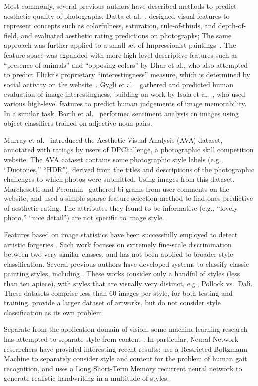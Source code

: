 Most commonly, several previous authors have described methods to predict aesthetic quality of photographs.
Datta et al.~\parencite{Datta-ECCV-2006}, designed visual features to represent concepts such as colorfulness, saturation, rule-of-thirds, and depth-of-field, and evaluated aesthetic rating predictions on photographs; The same approach was further applied to a small set of Impressionist paintings~\parencite{Li-SP-2009}.
The feature space was expanded with more high-level descriptive features such as ``presence of animals'' and ``opposing colors'' by Dhar et al., who also attempted to predict Flickr's proprietary ``interestingness'' measure, which is determined by social activity on the website~\parencite{Dhar-CVPR-2011}.
Gygli et al.~\parencite{Gygli-ICCV-2013} gathered and predicted human evaluation of image interestingness, building on work by Isola et al.~\parencite{Isola-CVPR-2011}, who used various high-level features to predict human judgements of image memorability.
In a similar task, Borth et al.~\parencite{Borth-MM-2013} performed sentiment analysis on images using object classifiers trained on adjective-noun pairs.

Murray et al.~\parencite{Murray-CVPR-2012} introduced the Aesthetic Visual Analysis (AVA) dataset, annotated with ratings by users of DPChallenge, a photographic skill competition website.
The AVA dataset contains some photographic style labels (e.g., ``Duotones,'' ``HDR''), derived from the titles and descriptions of the photographic challenges to which photos were submitted.
Using images from this dataset, Marchesotti and Peronnin~\parencite{Marchesotti-BMVC-2013} gathered bi-grams from user comments on the website, and used a simple sparse feature selection method to find ones predictive of aesthetic rating.
The attributes they found to be informative (e.g., ``lovely photo,'' ``nice detail'') are not specific to image style.

Features based on image statistics have been successfully employed to detect artistic forgeries \parencite{Lyu-PNAS-2004}.
Such work focuses on extremely fine-scale discrimination between two very similar classes, and has not been applied to broader style classification.
Several previous authors have developed systems to classify classic painting styles, including \parencite{keren2002,shamir2010}.
These works consider only a handful of styles (less than ten apiece), with styles that are visually very distinct, e.g., Pollock vs.~Dal\'{\i}.
These datasets comprise less than 60 images per style, for both testing and training.
\cite{Mensink2014} provide a larger dataset of artworks, but do not consider style classification as its own problem.

Separate from the application domain of vision, some machine learning research has attempted to separate style from content \parencite{Tenenbaum2000}.
In particular, Neural Network researchers have provided interesting recent results: \cite{Taylor-ICML-2009} use a Restricted Boltzmann Machine to separately consider style and content for the problem of human gait recognition, and \cite{Graves-arxiv-2013} uses a Long Short-Term Memory recurrent neural network to generate realistic handwriting in a multitude of styles.
